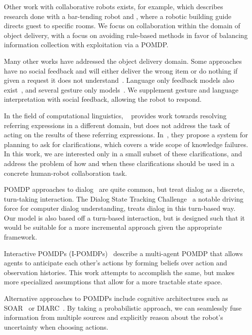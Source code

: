 \documentclass[conference]{IEEEtran}
\begin{document}
Other work with collaborative robots exists, for example, \citet{foster12} which describes research done with a bar-tending robot and \citet{bohus14}, where a robotic building guide directs guest to specific rooms. We focus on collaboration within the domain of object delivery, with a focus on avoiding rule-based methods in favor of  balancing information collection with exploitation via a POMDP. 

Many other works have addressed the object delivery domain. Some approaches have no social feedback and will either deliver the wrong item or do nothing if given a
request it does not understand~\citep{tellex11,matuszek12,tellex12,misra14}. Language only feedback models also 
exist~\citep{chai14,macmahon06,tellex11,matuszek12,guadarrama14,hewlett11,misra14}, and several gesture only models~\citep{waldherr00,marge11}. We supplement gesture and language interpretation with social feedback, allowing the robot to respond. 

In the field of computational linguistics, ~\citet{chairmi} provides work towards resolving referring expressions in a different domain, but does not address the task of acting on the results of these referring expressions. In~\citet{kruijffclarification}, they propose a system for planning to ask for clarifications, which covers a wide scope of knowledge failures. In this work, we are interested only in a small subset of these clarifications, and address the problem of how and when these clarifications should be used in a concrete human-robot collaboration task. 

POMDP approaches to dialog~\citep{young13} are quite common, but treat dialog
as a discrete, turn-taking interaction. The Dialog State Tracking
Challenge~\citep{williams2013dialog} a notable driving force for computer
dialog understanding, treats dialog in this turn-based way. Our model is also based off a turn-based interaction, but is designed such that it would be suitable for a more incremental approach given the appropriate framework. 

Interactive POMDPs (I-POMDPs)~\citep{gmytrasiewicz2005framework} describe a multi-agent POMDP that allows agents to anticipate each other's actions by forming beliefs over action and observation histories. This work attempts to accomplish the same, but makes more specialized assumptions that allow for a more tractable state space. 

Alternative approaches to
POMDPs include cognitive architectures such as SOAR~\citep{soar} or
DIARC~\citep{diarc}.  By taking a probabilistic approach, we can seamlessly
fuse information from multiple sources and explicitly reason about the
robot's uncertainty when choosing actions.
\end{document}
